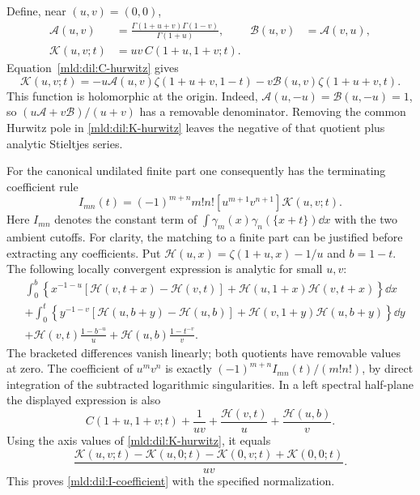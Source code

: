 Define, near $(u,v)=(0,0)$,
\begin{align*}
 \mathcal A(u,v)&=
  \frac{\Gamma(1+u+v)\Gamma(1-v)}{\Gamma(1+u)},
 &\mathcal B(u,v)&=\mathcal A(v,u),\\
 \mathcal K(u,v;t)&=uv\,C(1+u,1+v;t).
\end{align*}
Equation~\eqref{mld:dil:C-hurwitz} gives
\begin{equation}
 \mathcal K(u,v;t)=
 -u\mathcal A(u,v)\zeta(1+u+v,1-t)
 -v\mathcal B(u,v)\zeta(1+u+v,t).
 \label{mld:dil:K-hurwitz}
\end{equation}
This function is holomorphic at the origin. Indeed,
$\mathcal A(u,-u)=\mathcal B(u,-u)=1$, so
$(u\mathcal A+v\mathcal B)/(u+v)$ has a removable denominator. Removing
the common Hurwitz pole in \eqref{mld:dil:K-hurwitz} leaves the negative of that
quotient plus analytic Stieltjes series.

For the canonical undilated finite part one consequently has the
terminating coefficient rule
\begin{equation}
 \boxed{I_{mn}(t)=(-1)^{m+n}m!n!
       [u^{m+1}v^{n+1}]\mathcal K(u,v;t).}
 \label{mld:dil:I-coefficient}
\end{equation}
Here $I_{mn}$ denotes the constant term of
$\int\gamma_m(x)\gamma_n(\{x+t\})\dd x$ with the two ambient cutoffs.
For clarity, the matching to a finite part can be justified before
extracting any coefficients. Put
$\mathcal H(u,x)=\zeta(1+u,x)-1/u$ and $b=1-t$.
The following locally convergent expression is analytic for small $u,v$:
\begin{align*}
 &\int_0^b\left\{
 x^{-1-u}[\mathcal H(v,t+x)-\mathcal H(v,t)]
       +\mathcal H(u,1+x)\mathcal H(v,t+x)\right\}\dd x\\
 &+\int_0^t\left\{
 y^{-1-v}[\mathcal H(u,b+y)-\mathcal H(u,b)]
       +\mathcal H(v,1+y)\mathcal H(u,b+y)\right\}\dd y\\
 &+\mathcal H(v,t)\frac{1-b^{-u}}u
       +\mathcal H(u,b)\frac{1-t^{-v}}v.
\end{align*}
The bracketed differences vanish linearly; both quotients have removable
values at zero. The coefficient of $u^mv^n$ is exactly
$(-1)^{m+n}I_{mn}(t)/(m!n!)$, by direct integration of the subtracted
logarithmic singularities. In a left spectral half-plane the displayed
expression is also
\[
 C(1+u,1+v;t)+\frac1{uv}
       +\frac{\mathcal H(v,t)}u+\frac{\mathcal H(u,b)}v.
\]
Using the axis values of \eqref{mld:dil:K-hurwitz}, it equals
\[
 \frac{\mathcal K(u,v;t)-\mathcal K(u,0;t)
            -\mathcal K(0,v;t)+\mathcal K(0,0;t)}{uv}.
\]
This proves \eqref{mld:dil:I-coefficient} with the specified normalization.

